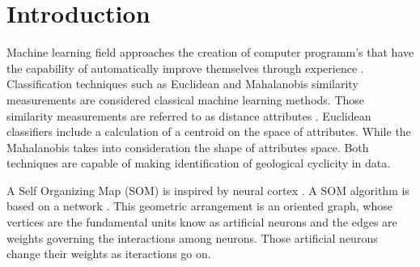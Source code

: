 \documentclass{cph18}
\begin{document}
\section{Introduction}
   
Machine learning field approaches the creation of computer programm's that have the capability of automatically improve themselves through experience \citep{Michie1994,Levy1997,MacKay2005}. Classification techniques such as Euclidean and Mahalanobis similarity measurements are considered classical machine learning methods.  Those similarity measurements are referred to as distance attributes \citep{Deza2016}. Euclidean classifiers include a calculation of a centroid on the space of attributes. While the Mahalanobis takes into consideration the shape of attributes space. Both techniques are capable of making identification of geological cyclicity in data.



A Self Organizing Map (SOM) is inspired by neural cortex \citep{Kohonen1989}. A SOM algorithm is based on a network \citep{Haykin2001}. This geometric arrangement is an oriented graph, whose vertices are the fundamental units know as artificial neurons and the edges are weights governing the interactions among neurons. Those artificial neurons change their weights as iteractions go on. 
\end{document}
